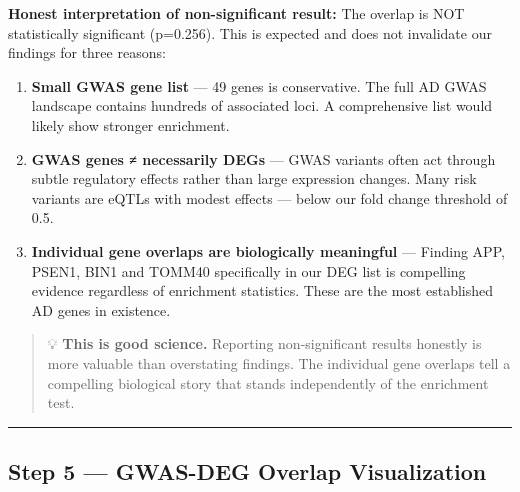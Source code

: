 \documentclass[
]{article}
\begin{document}
\textbf{Honest interpretation of non-significant result:} The overlap is
NOT statistically significant (p=0.256). This is expected and does not
invalidate our findings for three reasons:

\begin{enumerate}
\def\labelenumi{\arabic{enumi}.}
\item
  \textbf{Small GWAS gene list} --- 49 genes is conservative. The full
  AD GWAS landscape contains hundreds of associated loci. A
  comprehensive list would likely show stronger enrichment.
\item
  \textbf{GWAS genes ≠ necessarily DEGs} --- GWAS variants often act
  through subtle regulatory effects rather than large expression
  changes. Many risk variants are eQTLs with modest effects --- below
  our fold change threshold of 0.5.
\item
  \textbf{Individual gene overlaps are biologically meaningful} ---
  Finding APP, PSEN1, BIN1 and TOMM40 specifically in our DEG list is
  compelling evidence regardless of enrichment statistics. These are the
  most established AD genes in existence.
\end{enumerate}

\begin{quote}
💡 \textbf{This is good science.} Reporting non-significant results
honestly is more valuable than overstating findings. The individual gene
overlaps tell a compelling biological story that stands independently of
the enrichment test.
\end{quote}

\begin{center}\rule{0.5\linewidth}{0.5pt}\end{center}

\subsection{Step 5 --- GWAS-DEG Overlap
Visualization}\label{step-5-gwas-deg-overlap-visualization}
\end{document}
